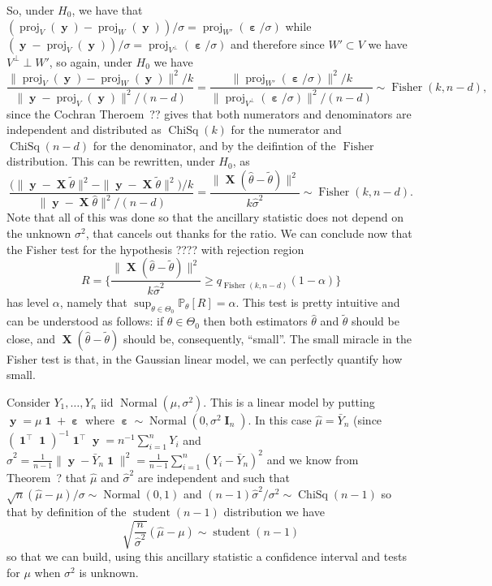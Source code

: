 \documentclass[
	fontsize=11pt, %
	twoside=false, %
	numbers=noenddot, %
]{kaobook}
\DeclareMathOperator{\bI}{\boldsymbol I}
\DeclareMathOperator{\bX}{\boldsymbol X}
\DeclareMathOperator{\by}{\boldsymbol y}
\DeclareMathOperator{\bone}{\boldsymbol 1}
\DeclareMathOperator{\beps}{\boldsymbol \varepsilon}
\DeclareMathOperator{\chisq}{ChiSq}
\DeclareMathOperator{\fis}{Fisher}
\DeclareMathOperator{\nor}{Normal}
\DeclareMathOperator{\stu}{student}
\DeclareMathOperator{\proj}{proj}
\renewcommand{\P}{\mathbb P}
\newcommand{\wh}{\widehat}
\newcommand{\norm}[1]{\|#1\|}
\begin{document}
So, under $H_0$, we have that $(\proj_V(\by) - \proj_W(\by)) / \sigma = \proj_{W'}(\beps / \sigma)$ while 
 $(\by - \proj_V(\by)) / \sigma = \proj_{V^\perp}(\beps / \sigma)$ and therefore since $W' \subset V$ we have $V^\perp \perp W'$, so again, under $H_0$ we have
 \begin{equation*}
 	\frac{\norm{\proj_V(\by) - \proj_W(\by)}^2 / k}{\norm{\by - \proj_V(\by)}^2 / (n - d)} =
 	\frac{\norm{\proj_{W'}(\beps / \sigma)}^2 / k}{\norm{\proj_{V^\perp}(\beps / \sigma)}^2 / (n-d)} \sim \fis(k, n-d),
 \end{equation*}
 since the Cochran Theroem~?? gives that both numerators and denominators are independent and distributed as $\chisq(k)$ for the numerator and $\chisq(n - d)$ for the denominator, and by the deifintion of the $\fis$ distribution.
 This can be rewritten, under $H_0$, as 
 \begin{equation*}
 	\frac{\big(\norm{\by - \bX \tilde \theta}^2 - \norm{\by - \bX \tilde \theta}^2\big) / k}
 	{\norm{\by - \bX \wh \theta}^2 / (n - d)} = \frac{\norm{\bX (\wh \theta - \tilde \theta)}^2}{k \wh \sigma^2} \sim \fis(k, n-d).
 \end{equation*}
 Note that all of this was done so that the ancillary statistic does not depend on the unknown $\sigma^2$, that cancels out thanks for the ratio.
We can conclude now that the Fisher test for the hypothesis ???? with rejection region
\begin{equation*}
	R = \bigg\{  \frac{\norm{\bX (\wh \theta - \tilde \theta)}^2}{k \wh \sigma^2}  \geq q_{\fis(k, n-d)}(1 - \alpha)  \bigg\}
\end{equation*}
has level $\alpha$, namely that $\sup_{\theta \in \Theta_0} \P_\theta[R] = \alpha$.
This test is pretty intuitive and can be understood as follows: if $\theta \in \Theta_0$ then both estimators $\wh \theta$ and $\tilde \theta$ should be close, and $\bX (\wh \theta - \tilde \theta)$ should be, consequently, ``small''. The small miracle in the Fisher test is that, in the Gaussian linear model, we can perfectly quantify how small.

\begin{example}
	Consider $Y_1, \ldots, Y_n$ iid $\nor(\mu, \sigma^2)$. This is a linear model by putting $\by = \mu \bone + \beps$ where $\beps \sim \nor(0, \sigma^2 \bI_n)$.
	In this case $\wh \mu = \bar Y_n$ (since $(\bone^\top \bone)^{-1} \bone^\top \by = n^{-1} \sum_{i=1}^n Y_i$ and $\wh \sigma^2 = \frac{1}{n-1} \norm{\by - \bar Y_n \bone}^2 =  \frac{1}{n-1} \sum_{i=1}^n (Y_i - \bar Y_n)^2$ and we know from Theorem~? that $\wh \mu$ and $\wh \sigma^2$ are independent and such that $\sqrt n (\wh \mu - \mu) / \sigma \sim \nor(0, 1)$ and $(n-1) \wh \sigma^2/\sigma^2 \sim \chisq(n-1)$ so that by definition of the $\stu(n-1)$ distribution we have
	\begin{equation*}
		\sqrt{\frac{n}{\wh \sigma^2}} (\wh \mu - \mu) \sim \stu(n-1)
	\end{equation*}
	so that we can build, using this ancillary statistic a confidence interval and tests for $\mu$ when $\sigma^2$ is unknown.
\end{example}
\end{document}
